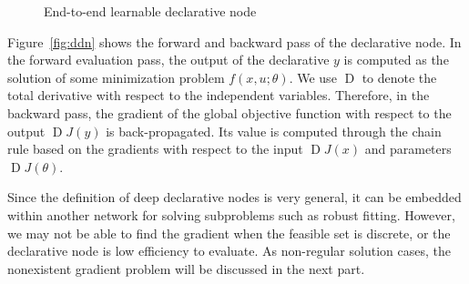 \begin{figure}

    \caption{End-to-end learnable declarative node~\citep{SG:19}}
\end{figure}
\par Figure~\ref{fig:ddn} shows the forward and backward pass of the declarative node. In the forward evaluation pass, the output of the declarative $y$ is computed as the solution of some minimization problem $f(x, u; \theta)$. We use $\operatorname{D}$ to denote the total derivative with respect to the independent variables. Therefore, in the backward pass, the gradient of the global objective function with respect to the output $\operatorname{D}J(y)$ is back-propagated. Its value is computed through the chain rule based on the gradients with respect to the input $\operatorname{D}J(x)$ and parameters $\operatorname{D}J(\theta)$.
\par Since the definition of deep declarative nodes is very general, it can be embedded within another network for solving subproblems such as robust fitting. However, we may not be able to find the gradient when the feasible set is discrete, or the declarative node is low efficiency to evaluate. As non-regular solution cases, the nonexistent gradient problem will be discussed in the next part. 

